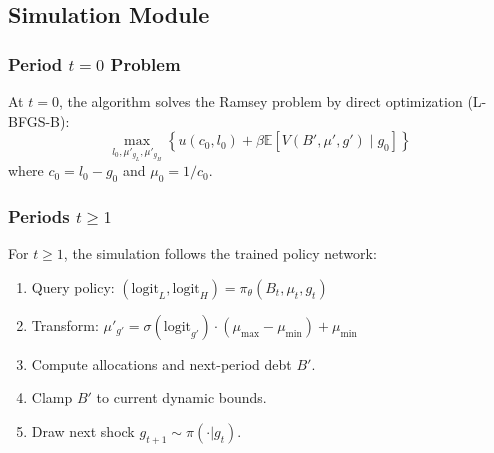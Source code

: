 \subsection{Simulation Module}

\subsubsection{Period $t=0$ Problem}
At $t=0$, the algorithm solves the Ramsey problem by direct optimization (L-BFGS-B):
\[ \max_{l_0, \mu'_{g_L}, \mu'_{g_H}} \left\{ u(c_0, l_0) + \beta \mathbb{E}[V(B', \mu', g') \mid g_0] \right\} \]
where $c_0 = l_0 - g_0$ and $\mu_0 = 1/c_0$.

\subsubsection{Periods $t \geq 1$}
For $t \geq 1$, the simulation follows the trained policy network:
\begin{enumerate}
    \item Query policy: $(\text{logit}_L, \text{logit}_H) = \pi_\theta(B_t, \mu_t, g_t)$
    \item Transform: $\mu'_{g'} = \sigma(\text{logit}_{g'}) \cdot (\mu_{\max} - \mu_{\min}) + \mu_{\min}$
    \item Compute allocations and next-period debt $B'$.
    \item Clamp $B'$ to current dynamic bounds.
    \item Draw next shock $g_{t+1} \sim \pi(\cdot | g_t)$.
\end{enumerate}

